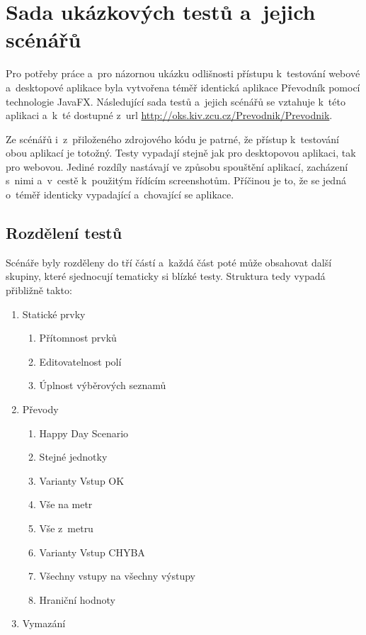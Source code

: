 \chapter{Sada ukázkových testů a~jejich scénářů}
Pro potřeby práce a~pro názornou ukázku odlišnosti přístupu k~testování webové a~desktopové aplikace byla vytvořena téměř identická aplikace Převodník pomocí technologie JavaFX. Následující sada testů a~jejich scénářů se vztahuje k~této aplikaci a~k~té dostupné z~url \url{http://oks.kiv.zcu.cz/Prevodnik/Prevodnik}.

Ze scénářů i~z~přiloženého zdrojového kódu je patrné, že přístup k~testování obou aplikací je totožný. Testy vypadají stejně jak pro desktopovou aplikaci, tak pro webovou. Jediné rozdíly nastávají ve způsobu spouštění aplikací, zacházení s~nimi a~v~cestě k~použitým řídícím screenshotům. Příčinou je to, že se jedná o~téměř identicky vypadající a~chovající se aplikace.

	\section{Rozdělení testů}
	Scénáře byly rozděleny do tří částí a~každá část poté může obsahovat další skupiny, které sjednocují tematicky si blízké testy. Struktura tedy vypadá přibližně takto:
		{\renewcommand{\labelenumii}{\theenumii}
		\renewcommand{\theenumii}{\theenumi.\arabic{enumii}.}
		\begin{enumerate}
		\item Statické prvky
			\begin{enumerate}
			\item Přítomnost prvků
			\item Editovatelnost polí
			\item Úplnost výběrových seznamů
			\end{enumerate}
		\item Převody
			\begin{enumerate}
			\item Happy Day Scenario
			\item Stejné jednotky
			\item Varianty Vstup OK
			\item Vše na metr
			\item Vše z~metru
			\item Varianty Vstup CHYBA
			\item Všechny vstupy na všechny výstupy
			\item Hraniční hodnoty
			\end{enumerate}
		\item Vymazání
		\end{enumerate}}
		
